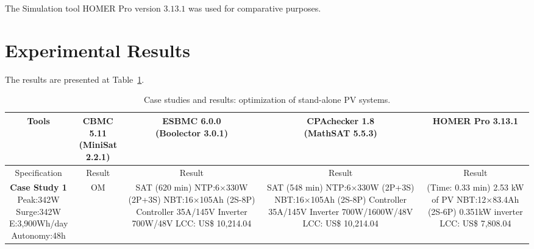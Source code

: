 The Simulation tool HOMER Pro version $3.13.1$ was used for comparative purposes.

\section{Experimental Results}  
\label{sec:synthesisresults}

The results are presented at Table~\ref{tab1}. 

\begin{table}
\caption{Case studies and results: optimization of stand-alone PV systems.}\label{tab1}
\begin{scriptsize}
\begin{tabular}{c|c|c|c|c}
\hline
\hline
Tools & \makecell{CBMC 5.11 \\(MiniSat 2.2.1)}& \makecell{ESBMC 6.0.0 \\(Boolector 3.0.1)}& \makecell{CPAchecker 1.8\\(MathSAT 5.5.3)}& HOMER Pro 3.13.1\\
\hline
\hline
Specification & Result & Result & Result & Result \\
\hline
\makecell{\textbf{Case Study 1}\\Peak:342W\\Surge:342W \\E:3,900Wh/day\\Autonomy:48h} & OM & \makecell{SAT (620 min) \\NTP:6$\times$330W (2P+3S)\\NBT:16$\times$105Ah (2S-8P)\\Controller 35A/145V\\Inverter 700W/48V\\LCC: US\$ 10,214.04} & \makecell{SAT (548 min) \\NTP:6$\times$330W (2P+3S)\\NBT:16$\times$105Ah (2S-8P)\\Controller 35A/145V\\Inverter 700W/1600W/48V\\LCC: US\$ 10,214.04} & \makecell{(Time: 0.33 min)\\2.53 kW of PV\\NBT:12$\times$83.4Ah (2S-6P)\\0.351kW inverter\\LCC: US\$ 7,808.04}\\

\end{tabular}
\end{scriptsize}
\end{table}
